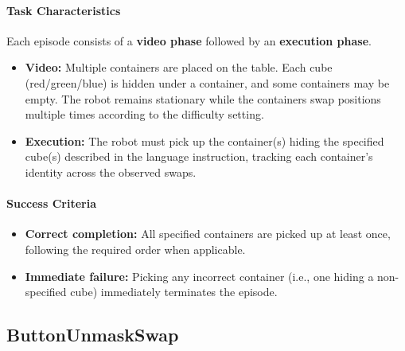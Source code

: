 \paragraph{Task Characteristics}
Each episode consists of a \textbf{video phase} followed by an \textbf{execution phase}.
\begin{itemize}[itemsep=1pt, topsep=0pt, leftmargin=*]
    \item \textbf{Video:} Multiple containers are placed on the table. Each cube (red/green/blue) is hidden under a container, and some containers may be empty. The robot remains stationary while the containers swap positions multiple times according to the difficulty setting.
    
    \item \textbf{Execution:} The robot must pick up the container(s) hiding the specified cube(s) described in the language instruction, tracking each container’s identity across the observed swaps.
\end{itemize}

\paragraph{Success Criteria}
\begin{itemize}[itemsep=1pt, topsep=0pt, leftmargin=*]
    \item \textbf{Correct completion:} All specified containers are picked up at least once, following the required order when applicable.
    
    \item \textbf{Immediate failure:} Picking any incorrect container (i.e., one hiding a non-specified cube) immediately terminates the episode.
\end{itemize}



\clearpage







\subsection{ButtonUnmaskSwap}
\label{sec:task_buttonunmaskswap}

